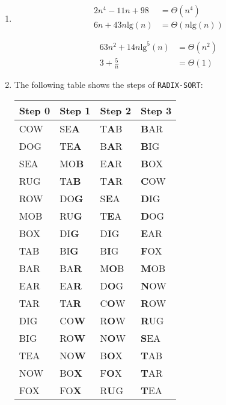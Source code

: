 \documentclass{article}
\begin{document}
\begin{enumerate}[1.]
    
    \item
    \begin{multicols}{2}
        \begin{align*}
            2n^4 - 11n + 98 &= \Theta(n^4)\\
            6n + 43n \text{lg}(n) &= \Theta(n \text{lg}(n))\\
        \end{align*}
        \begin{align*}
            \\
            63n^2 + 14n \text{lg}^5(n) &= \Theta(n^2)\\
            3 + \frac{5}{n} &= \Theta(1)
        \end{align*}
    \end{multicols}

    
    \item The following table shows the steps of \texttt{RADIX-SORT}:
    	\begin{table}[h!t]
		\centering
		\begin{tabular}{llll}
			\toprule
			Step 0 & Step 1 & Step 2 & Step 3\\
			\midrule
			COW & SE\textbf{A} & T\textbf{A}B & \textbf{B}AR \\
			DOG & TE\textbf{A} & B\textbf{A}R & \textbf{B}IG \\
			SEA & MO\textbf{B} & E\textbf{A}R & \textbf{B}OX \\
			RUG & TA\textbf{B} & T\textbf{A}R & \textbf{C}OW \\
			ROW & DO\textbf{G} & S\textbf{E}A & \textbf{D}IG \\
			MOB & RU\textbf{G} & T\textbf{E}A & \textbf{D}OG \\
			BOX & DI\textbf{G} & D\textbf{I}G & \textbf{E}AR \\
			TAB & BI\textbf{G} & B\textbf{I}G & \textbf{F}OX \\
			BAR & BA\textbf{R} & M\textbf{O}B & \textbf{M}OB \\
			EAR & EA\textbf{R} & D\textbf{O}G & \textbf{N}OW \\
			TAR & TA\textbf{R} & C\textbf{O}W & \textbf{R}OW \\
			DIG & CO\textbf{W} & R\textbf{O}W & \textbf{R}UG \\
			BIG & RO\textbf{W} & N\textbf{O}W & \textbf{S}EA \\
			TEA & NO\textbf{W} & B\textbf{O}X & \textbf{T}AB \\
			NOW & BO\textbf{X} & F\textbf{O}X & \textbf{T}AR \\
			FOX & FO\textbf{X} & R\textbf{U}G & \textbf{T}EA \\
			\bottomrule
		\end{tabular}
	    \end{table}
	

\end{enumerate}
\end{document}
